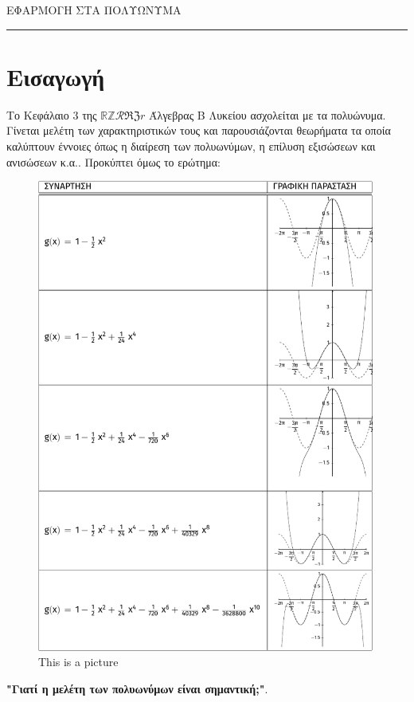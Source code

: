 \documentclass[12pt]{article}
\begin{document}
\begin{center}
\huge{ΕΦΑΡΜΟΓΗ ΣΤΑ ΠΟΛΥΩΝΥΜΑ}
\end{center}
\rule{\textwidth}{2pt}
\section*{Εισαγωγή \the\value{section}}
Το Κεφάλαιο 3 της $\mathbb{R} \mathbb{Z} \mathcal{R} \mathfrak{R Z} r$ Άλγεβρας Β Λυκείου ασχολείται με τα πολυώνυμα. Γίνεται μελέτη των χαρακτηριστικών τους και παρουσιάζονται θεωρήματα τα οποία καλύπτουν έννοιες όπως η διαίρεση των πολυωνύμων, η επίλυση εξισώσεων και ανισώσεων κ.α.. Προκύπτει όμως το ερώτημα:\begin{figure}[h]
	\centering	\includegraphics[width=0.99\textwidth]{tikzpic1.pdf}
	\caption{This is a picture}
\end{figure}
\begin{center}

	\textbf{"Γιατί η μελέτη των πολυωνύμων είναι σημαντική;"}.
\end{center}
\end{document}
